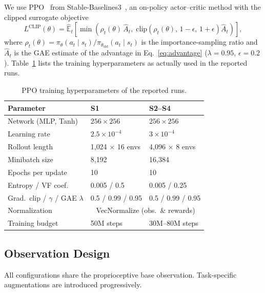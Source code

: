 \documentclass[conference,a4paper]{IEEEtran}
\begin{document}
We use PPO~\cite{schulman2017ppo} from Stable-Baselines3~\cite{raffin2021sb3}, an on-policy actor--critic method with the clipped surrogate objective
\begin{equation}
\label{eq:ppo}
L^{\mathrm{CLIP}}(\theta) = \hat{\mathbb{E}}_t \!\left[ \min\!\left( \rho_t(\theta)\,\hat{A}_t,\; \mathrm{clip}\!\left(\rho_t(\theta),\, 1{-}\epsilon,\, 1{+}\epsilon\right)\hat{A}_t \right) \right],
\end{equation}
where $\rho_t(\theta) = \pi_\theta(a_t \mid s_t)/\pi_{\theta_{\mathrm{old}}}(a_t \mid s_t)$ is the importance-sampling ratio and $\hat{A}_t$ is the GAE estimate of the advantage in Eq.~\eqref{eq:advantage} ($\lambda = 0.95$, $\epsilon = 0.2$). Table~\ref{tab:hyperparams} lists the training hyperparameters as actually used in the reported runs.

\begin{table}[t]
\caption{PPO training hyperparameters of the reported runs.}
\label{tab:hyperparams}
\centering
\small
\begin{tabular}{@{}lll@{}}
\toprule
\textbf{Parameter} & \textbf{S1} & \textbf{S2--S4} \\
\midrule
Network (MLP, Tanh) & $256 \times 256$ & $256 \times 256$ \\
Learning rate & $2.5 \times 10^{-4}$ & $3 \times 10^{-4}$ \\
Rollout length & 1{,}024 $\times$ 16 envs & 4{,}096 $\times$ 8 envs \\
Minibatch size & 8{,}192 & 16{,}384 \\
Epochs per update & 10 & 10 \\
Entropy / VF coef. & 0.005 / 0.5 & 0.005 / 0.25 \\
Grad.\ clip / $\gamma$ / GAE $\lambda$ & 0.5 / 0.99 / 0.95 & 0.5 / 0.99 / 0.95 \\
Normalization & \multicolumn{2}{c}{VecNormalize (obs.\ \& rewards)} \\
Training budget & 50M steps & 30M--80M steps \\
\bottomrule
\end{tabular}
\end{table}

\subsection{Observation Design}
\label{sec:obs_design}

All configurations share the proprioceptive base observation. Task-specific augmentations are introduced progressively.
\end{document}
